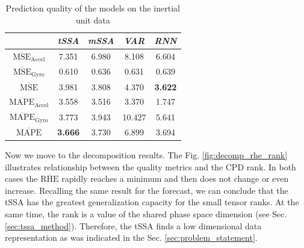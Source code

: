 \documentclass[referee, pdflatex, sn-mathphys-num]{sn-jnl}
\theoremstyle{definition}
\theoremstyle{plain}
\begin{document}
	\def\arraystretch{1.2}
	\begin{table}[h]
		\centering
		\caption{Prediction quality of the models on the inertial unit data}\label{tab:pred_res_motion}
		\begin{tabular}{|c|c|c|c|c|}
			\hline
			& \textit{tSSA}                & \textit{mSSA} & \textit{VAR} & \textit{RNN} \\ \hline
			$ \overline{\text{MSE}}_{\text{Accel}} $  & 7.351          & 6.980 & 8.108  & 6.604          \\ \hline
			$ \overline{\text{MSE}}_{\text{Gyro}} $   & 0.610          & 0.636 & 0.631  & 0.639          \\ \hline
			$ \overline{\text{MSE}} $         & 3.981          & 3.808 & 4.370  & \textbf{3.622} \\ \hline
			$ \overline{\text{MAPE}}_{\text{Accel}} $ & 3.558          & 3.516 & 3.370  & 1.747          \\ \hline
			$ \overline{\text{MAPE}}_{\text{Gyro}} $  & 3.773          & 3.943 & 10.427 & 5.641          \\ \hline
			$ \overline{\text{MAPE}} $        & \textbf{3.666} & 3.730 & 6.899  & 3.694          \\ \hline
		\end{tabular}
	\end{table}
	
	Now we move to the decomposition results. The Fig. \ref{fig:decomp_rhe_rank} illustrates relationship between the quality metrics and the CPD rank. In both cases the $ \overline{\text{RHE}} $ rapidly reaches a minimum and then does not change or even increase. Recalling the same result for the forecast, we can conclude that the tSSA has the greatest generalization capacity for the small tensor ranks. At the same time, the rank is a value of the shared phase space dimension (see Sec. \ref{sec:tssa_method}). Therefore, the tSSA finds a low dimensional data representation as was indicated in the Sec. \ref{sec:problem_statement}.
	
\end{document}
